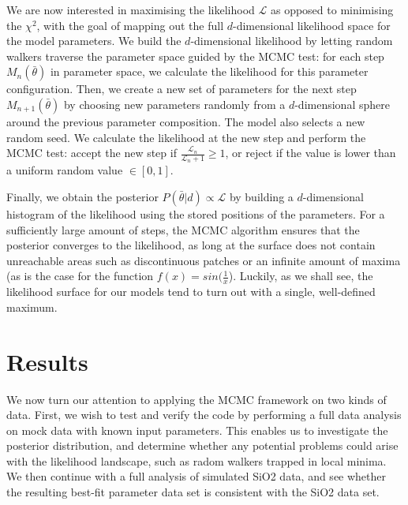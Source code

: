 \documentclass[aps,pre,twocolumn,letterpaper,floatfix,showpacs]{revtex4}
\begin{document}
We are now interested in maximising the likelihood $\mathcal L$ as opposed to minimising the $\chi^2$, with the goal of mapping out the full $d$-dimensional likelihood space for the model parameters. We build the $d$-dimensional likelihood by letting random walkers traverse the parameter space guided by the MCMC test: for each step $M_n(\bar \theta)$ in parameter space, we calculate the likelihood for this parameter configuration. Then, we create a new set of parameters for the next step $M_{n+1}(\bar \theta)$ by choosing new parameters randomly from a $d$-dimensional sphere around the previous parameter composition. The model also selects a new random seed. We calculate the likelihood at the new step and perform the MCMC test: accept the new step if $\frac{\mathcal L_n}{\mathcal L_n+1} \ge 1$, or reject if the value is lower than a uniform random value $\in [0,1]$. 

Finally, we obtain the posterior $P(\bar \theta | d) \propto \mathcal L$ by building a $d$-dimensional histogram of the likelihood using the stored positions of the parameters. For a sufficiently large amount of steps, the MCMC algorithm ensures that the posterior converges to the likelihood, as long at the surface does not contain unreachable areas such as discontinuous patches or an infinite amount of maxima (as is the case for the function $f(x)=sin(\frac{1}{x}$). Luckily, as we shall see, the likelihood surface for our models tend to turn out with a single, well-defined maximum.  


\section{Results}
We now turn our attention to applying the MCMC framework on two kinds of data. First, we wish to test and verify the code by performing a full data analysis on mock data with known input parameters. This enables us to investigate the posterior distribution, and determine whether any potential problems could arise with the likelihood landscape, such as radom walkers trapped in local minima. We then continue with a full analysis of simulated SiO2 data, and see whether the resulting best-fit parameter data set is consistent with the SiO2 data set. 
\end{document}
